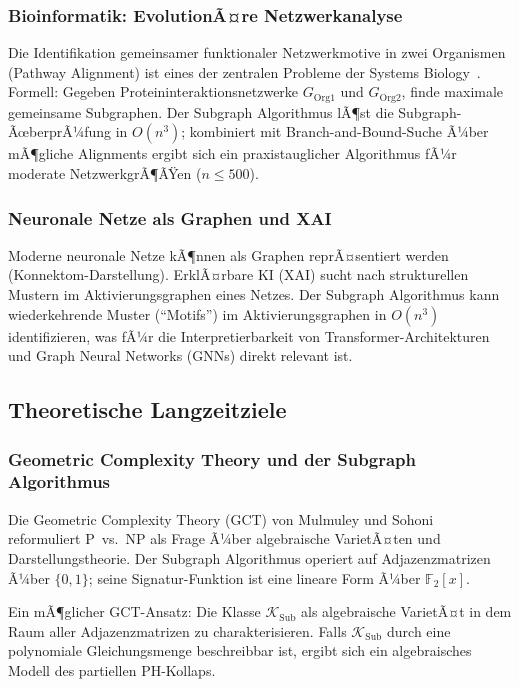 ﻿\documentclass[a4paper,12pt]{article}
\theoremstyle{definition}
\begin{document}
\subsubsection{Bioinformatik: EvolutionÃ¤re Netzwerkanalyse}

Die Identifikation gemeinsamer funktionaler Netzwerkmotive in zwei Organismen
(Pathway Alignment) ist eines der zentralen Probleme der Systems Biology~\cite{sharan2006comparative}.
Formell: Gegeben Proteininteraktionsnetzwerke $G_\mathrm{Org1}$ und $G_\mathrm{Org2}$,
finde maximale gemeinsame Subgraphen.
Der Subgraph Algorithmus lÃ¶st die Subgraph-ÃœberprÃ¼fung in $O(n^3)$;
kombiniert mit Branch-and-Bound-Suche Ã¼ber mÃ¶gliche Alignments ergibt sich
ein praxistauglicher Algorithmus fÃ¼r moderate NetzwerkgrÃ¶ÃŸen ($n \leq 500$).

\subsubsection{Neuronale Netze als Graphen und XAI}

Moderne neuronale Netze kÃ¶nnen als Graphen reprÃ¤sentiert werden
(Konnektom-Darstellung). ErklÃ¤rbare KI (XAI) sucht nach strukturellen Mustern
im Aktivierungsgraphen eines Netzes.
Der Subgraph Algorithmus kann wiederkehrende Muster (``Motifs'') im
Aktivierungsgraphen in $O(n^3)$ identifizieren,
was fÃ¼r die Interpretierbarkeit von Transformer-Architekturen und
Graph Neural Networks (GNNs) direkt relevant ist.

\subsection{Theoretische Langzeitziele}

\subsubsection{Geometric Complexity Theory und der Subgraph Algorithmus}

Die Geometric Complexity Theory (GCT) von Mulmuley und Sohoni~\cite{mulmuley2001gct}
reformuliert P~vs.~NP als Frage Ã¼ber algebraische VarietÃ¤ten und Darstellungstheorie.
Der Subgraph Algorithmus operiert auf Adjazenzmatrizen Ã¼ber $\{0,1\}$;
seine Signatur-Funktion ist eine lineare Form Ã¼ber $\mathbb{F}_2[x]$.

Ein mÃ¶glicher GCT-Ansatz: Die Klasse $\mathcal{K}_\mathrm{Sub}$ als algebraische
VarietÃ¤t in dem Raum aller Adjazenzmatrizen zu charakterisieren.
Falls $\mathcal{K}_\mathrm{Sub}$ durch eine polynomiale Gleichungsmenge beschreibbar
ist, ergibt sich ein algebraisches Modell des partiellen PH-Kollaps.
\end{document}
